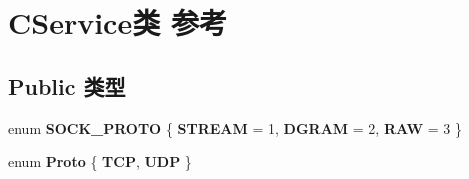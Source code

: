\hypertarget{class_c_service}{}\section{C\+Service类 参考}
\label{class_c_service}
\subsection*{Public 类型}
\begin{DoxyCompactItemize}
\item 
\mbox{\label{class_c_service_abd1684d960aef251b1d74edf372c5d1b}} 
enum {\bfseries S\+O\+C\+K\+\_\+\+P\+R\+O\+TO} \{ {\bfseries S\+T\+R\+E\+AM} = 1, 
{\bfseries D\+G\+R\+AM} = 2, 
{\bfseries R\+AW} = 3
 \}
\item 
\mbox{\label{class_c_service_a43fb60063bc9f9b0f4e3eeb1787056b0}} 
enum {\bfseries Proto} \{ {\bfseries T\+CP}, 
{\bfseries U\+DP}
 \}
\end{DoxyCompactItemize}
